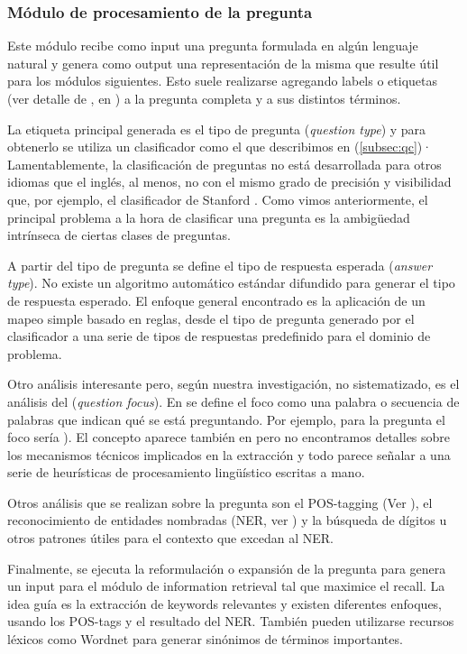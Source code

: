 \subsubsection*{Módulo de procesamiento de la pregunta}
Este módulo recibe como input una pregunta formulada en algún lenguaje natural y genera como output una representación de la misma que resulte útil para los módulos siguientes. Esto suele realizarse agregando labels o etiquetas (ver detalle de , en ) a la pregunta completa y a sus distintos términos.

La etiqueta principal generada es el tipo de pregunta (\textit{question type}) y para obtenerlo se utiliza un clasificador como el que describimos en (\ref{subsec:qc})· Lamentablemente, la clasificación de preguntas no está desarrollada para otros idiomas que el inglés, al menos, no con el mismo grado de precisión y visibilidad que, por ejemplo, el clasificador de Stanford \cite{QC1} \cite{QC2}. Como vimos anteriormente, el principal problema a la hora de clasificar una pregunta es la ambigüedad intrínseca de ciertas clases de preguntas.

A partir del tipo de pregunta se define el tipo de respuesta esperada (\textit{answer type}). No existe un algoritmo automático estándar difundido para generar el tipo de respuesta esperado. El enfoque general encontrado es la aplicación de un mapeo simple basado en reglas, desde el tipo de pregunta generado por el clasificador a una serie de tipos de respuestas predefinido para el dominio de problema.

Otro análisis interesante pero, según nuestra investigación, no sistematizado, es el análisis del  (\textit{question focus}). En \cite{QA3} se define el foco como una palabra o secuencia de palabras que indican qué se está preguntando. Por ejemplo, para la pregunta  el foco sería ). El concepto aparece también en \cite{WATSON1} pero no encontramos detalles sobre los mecanismos técnicos implicados en la extracción y todo parece señalar a una serie de heurísticas de procesamiento lingüístico escritas a mano.

Otros análisis que se realizan sobre la pregunta son el POS-tagging (Ver ), el reconocimiento de entidades nombradas (NER, ver ) y la búsqueda de dígitos u otros patrones útiles para el contexto que excedan al NER.

Finalmente, se ejecuta la reformulación o expansión de la pregunta para genera un input para el módulo de information retrieval tal que maximice el recall.
La idea guía es la extracción de keywords relevantes y existen diferentes enfoques, usando los POS-tags y el resultado del NER. También pueden utilizarse recursos léxicos como Wordnet para generar sinónimos de términos importantes.

